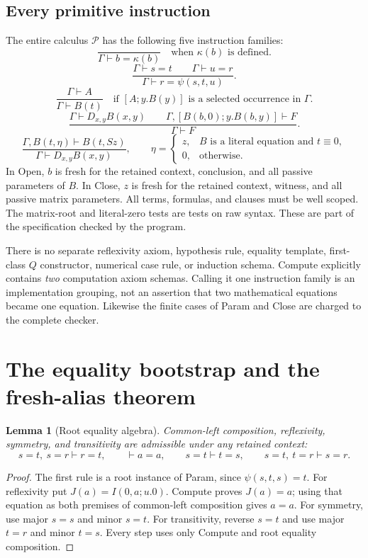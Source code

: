 \documentclass[11pt,letterpaper]{article}
\newtheorem{lemma}[theorem]{Lemma}
\begin{document}
\subsection{Every primitive instruction}

The entire calculus $\mathcal P$ has the following five instruction
families:
\[
 \frac{}{\Gamma\vdash b=\kappa(b)}
 \quad\text{when }\kappa(b)\text{ is defined}.
 \tag{Compute}\label{rule:rp-compute}
\]
\[
 \frac{\Gamma\vdash s=t\qquad\Gamma\vdash u=r}
      {\Gamma\vdash r=\psi(s,t,u)}.
 \tag{Param}\label{rule:rp-param}
\]
\[
 \frac{\Gamma\vdash A}{\Gamma\vdash B(t)}
 \quad\text{if }[A;y.B(y)]\text{ is a selected occurrence in }\Gamma.
 \tag{Use}\label{rule:rp-use}
\]
\[
 \frac{\Gamma\vdash D_{x,y}B(x,y)\qquad
       \Gamma,[B(b,0);y.B(b,y)]\vdash F}
      {\Gamma\vdash F}.
 \tag{Open}\label{rule:rp-open}
\]
\[
 \frac{\Gamma,B(t,\eta)\vdash B(t,Sz)}
      {\Gamma\vdash D_{x,y}B(x,y)},\qquad
 \eta=\begin{cases}
 z,&B\text{ is a literal equation and }t\equiv0,\\
 0,&\text{otherwise}.
 \end{cases}
 \tag{Close}\label{rule:rp-close}
\]
In Open, $b$ is fresh for the retained context, conclusion, and all passive
parameters of $B$.  In Close, $z$ is fresh for the retained context,
witness, and all passive matrix parameters.  All terms, formulas, and
clauses must be well scoped.  The matrix-root and literal-zero tests are
tests on raw syntax.  These are part of the specification checked by the
program.

There is no separate reflexivity axiom, hypothesis rule, equality template,
first-class $Q$ constructor, numerical case rule, or induction schema.
Compute explicitly contains \emph{two} computation axiom schemas.  Calling
it one instruction family is an implementation grouping, not an assertion
that two mathematical equations became one equation.  Likewise the
finite cases of Param and Close are charged to the complete checker.

\section{The equality bootstrap and the fresh-alias theorem}
\label{sec:rp-bootstrap}

\begin{lemma}[Root equality algebra]
Common-left composition, reflexivity, symmetry, and transitivity are
admissible under any retained context:
\[
 s=t,\ s=r\vdash r=t,\qquad
 \vdash a=a,\qquad
 s=t\vdash t=s,\qquad
 s=t,\ t=r\vdash s=r.
\]
\end{lemma}
\begin{proof}
The first rule is a root instance of Param, since $\psi(s,t,s)=t$.
For reflexivity put $J(a)=I(0,a;u.0)$.  Compute proves $J(a)=a$;
using that equation as both premises of common-left composition gives
$a=a$.  For symmetry, use major $s=s$ and minor $s=t$.  For
transitivity, reverse $s=t$ and use major $t=r$ and minor $t=s$.
Every step uses only Compute and root equality composition.
\end{proof}
\end{document}
